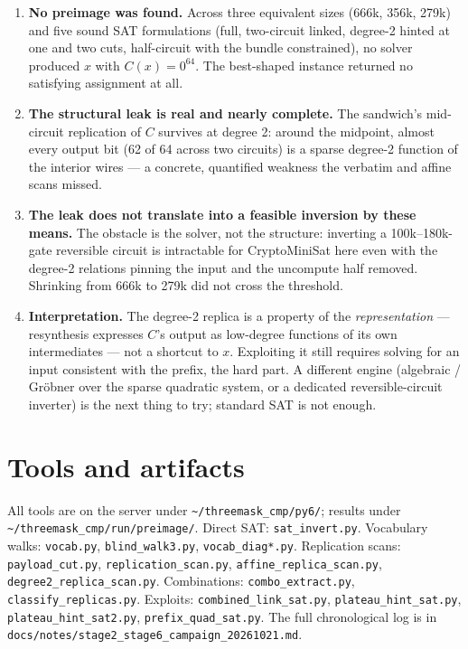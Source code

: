 \documentclass[11pt]{article}
\begin{document}
\begin{enumerate}[leftmargin=1.6em]
\item \textbf{No preimage was found.} Across three equivalent sizes (666k, 356k, 279k)
  and five sound SAT formulations (full, two-circuit linked, degree-2 hinted at one and
  two cuts, half-circuit with the bundle constrained), no solver produced $x$ with
  $C(x)=0^{64}$. The best-shaped instance returned no satisfying assignment at all.
\item \textbf{The structural leak is real and nearly complete.} The sandwich's
  mid-circuit replication of $C$ survives at degree 2: around the midpoint, almost every
  output bit (62 of 64 across two circuits) is a sparse degree-2 function of the interior
  wires --- a concrete, quantified weakness the verbatim and affine scans missed.
\item \textbf{The leak does not translate into a feasible inversion by these means.} The
  obstacle is the solver, not the structure: inverting a 100k--180k-gate reversible
  circuit is intractable for CryptoMiniSat here even with the degree-2 relations pinning
  the input and the uncompute half removed. Shrinking from 666k to 279k did not cross the
  threshold.
\item \textbf{Interpretation.} The degree-2 replica is a property of the
  \emph{representation} --- resynthesis expresses $C$'s output as low-degree functions of
  its own intermediates --- not a shortcut to $x$. Exploiting it still requires solving
  for an input consistent with the prefix, the hard part. A different engine (algebraic /
  Gr\"obner over the sparse quadratic system, or a dedicated reversible-circuit inverter)
  is the next thing to try; standard SAT is not enough.
\end{enumerate}

\section{Tools and artifacts}
All tools are on the server under \texttt{\textasciitilde/threemask\_cmp/py6/}; results
under \texttt{\textasciitilde/threemask\_cmp/run/preimage/}. Direct SAT:
\texttt{sat\_invert.py}. Vocabulary walks: \texttt{vocab.py}, \texttt{blind\_walk3.py},
\texttt{vocab\_diag*.py}. Replication scans: \texttt{payload\_cut.py},
\texttt{replication\_scan.py}, \texttt{affine\_replica\_scan.py},
\texttt{degree2\_replica\_scan.py}. Combinations: \texttt{combo\_extract.py},
\texttt{classify\_replicas.py}. Exploits: \texttt{combined\_link\_sat.py},
\texttt{plateau\_hint\_sat.py}, \texttt{plateau\_hint\_sat2.py},
\texttt{prefix\_quad\_sat.py}. The full chronological log is in
\texttt{docs/notes/stage2\_stage6\_campaign\_20261021.md}.
\end{document}
